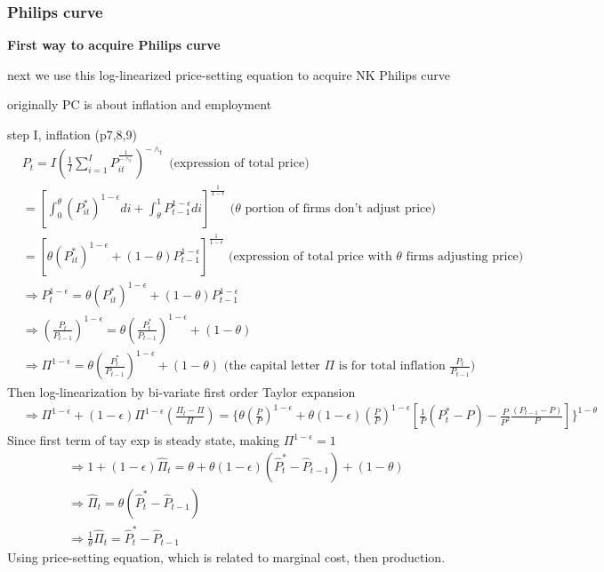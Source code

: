 \documentclass{article}
\begin{document}
\subsubsection{Philips curve}

\textbf{First way to acquire Philips curve}

next we use this log-linearized price-setting equation to acquire NK Philips curve

originally PC is about inflation and employment

step I, inflation (p7,8,9)
\begin{align}
& P_{t}=I(\frac{1}{I}\sum\limits_{i=1}^{I}P_{it}^\frac{1}{-\wedge_t})^{-\wedge_t}\text{ (expression of total price)}
\\& =[\int_{0}^{\theta} (P^{*}_{it})^{1-\epsilon}di+\int_{\theta}^{1} P_{t-1}^{1-\epsilon}di]^{ \frac{1}{1-\epsilon}}
\text{ ($\theta$ portion of firms don't adjust price)}
\\& =[\theta (P^{*}_{it})^{1-\epsilon}+(1-\theta) P_{t-1}^{1-\epsilon}]^{ \frac{1}{1-\epsilon}}
\text{ (expression of total price with $\theta$ firms adjusting price)}
\\& \Rightarrow P_t^{1-\epsilon}=\theta (P^{*}_{it})^{1-\epsilon}+(1-\theta) P_{t-1}^{1-\epsilon}
\\& \Rightarrow (\frac{P_t}{P_{t-1}})^{1-\epsilon}=\theta (\frac{P_t^*}{P_{t-1}})^{1-\epsilon}+(1-\theta) 
\\& \Rightarrow \Pi^{1-\epsilon}=\theta (\frac{P_t^*}{P_{t-1}})^{1-\epsilon}+(1-\theta) 
\text{ (the capital letter $\Pi$ is for total inflation $\frac{P_t}{P_{t-1}}$)}
\end{align}
Then log-linearization by bi-variate first order Taylor expansion
\begin{align}
& \Rightarrow \Pi^{1-\epsilon}+(1-\epsilon)\Pi^{1-\epsilon}(\frac{\Pi_t-\Pi}{\Pi})=\{\theta (\frac{P}{P})^{1-\epsilon}+\theta (1-\epsilon)(\frac{P}{P})^{1-\epsilon}[\frac{1}{P}(P^*_t-P)-\frac{P}{P^2} \frac{(P_{t-1}-P)}{P}]\}^{1-\theta}
\end{align}
Since first term of tay exp is steady state, making $\Pi^{1-\epsilon}=1$
\begin{align}
& \Rightarrow 1+(1-\epsilon)\hat \Pi_t=\theta+\theta(1-\epsilon)(\hat P_t^*-\hat P_{t-1})+(1-\theta)
\\& \Rightarrow \hat \Pi_t =\theta(\hat P_t^*-\hat P_{t-1})
\\& \Rightarrow \frac{1}{\theta}\hat \Pi_t=\hat P_t^*-\hat P_{t-1}
\end{align}
Using price-setting equation, which is related to marginal cost, then production.
\end{document}
